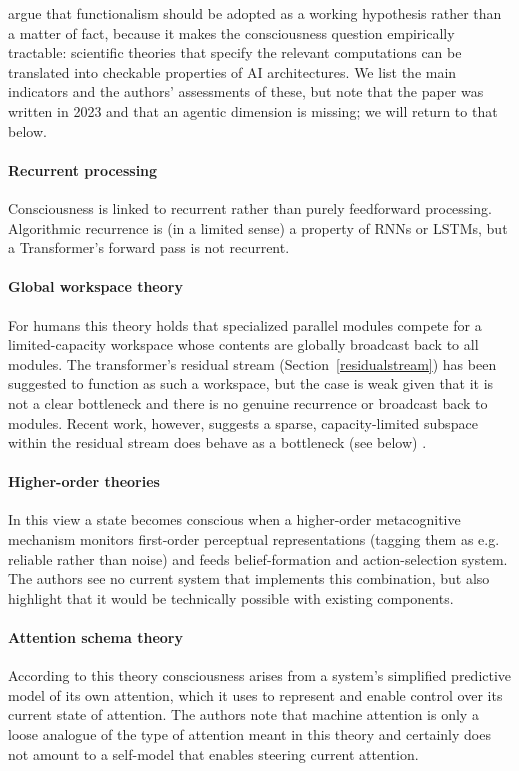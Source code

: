 \citet{butlin2023consciousness} argue that functionalism should be adopted as a working hypothesis rather than a matter of fact, because it makes the consciousness question empirically tractable: scientific theories that specify the relevant computations can be translated into checkable properties of AI architectures. We list the main indicators and the authors' assessments of these, but note that the paper was written in 2023 and that an agentic dimension is missing; we will return to that below.

\paragraph{Recurrent processing} Consciousness is linked to recurrent rather than purely feedforward processing. Algorithmic recurrence is (in a limited sense) a property of RNNs or LSTMs, but a Transformer's forward pass is not recurrent. 

\paragraph{Global workspace theory} For humans this theory holds that specialized parallel modules compete for a limited-capacity workspace whose contents are globally broadcast back to all modules. The transformer's residual stream (Section~\ref{residualstream}) has been suggested to function as such a workspace, but the case is weak given that it is not a clear bottleneck and there is no genuine recurrence or broadcast back to modules. Recent work, however, suggests a sparse, capacity-limited subspace within the residual stream does behave as a bottleneck (see below) \citep{gurnee2026verbalize}.

\paragraph{Higher-order theories} In this view a state becomes conscious when a higher-order metacognitive mechanism monitors first-order perceptual representations (tagging them as e.g. reliable rather than noise) and feeds belief-formation and action-selection system. The authors see no current system that implements this combination, but also highlight that it would be technically possible with existing components.

\paragraph{Attention schema theory} According to this theory consciousness arises from a system's simplified predictive model of its own attention, which it uses to represent and enable control over its current state of attention. The authors note that machine attention is only a loose analogue of the type of attention meant in this theory and certainly does not amount to a self-model that enables steering current attention.

